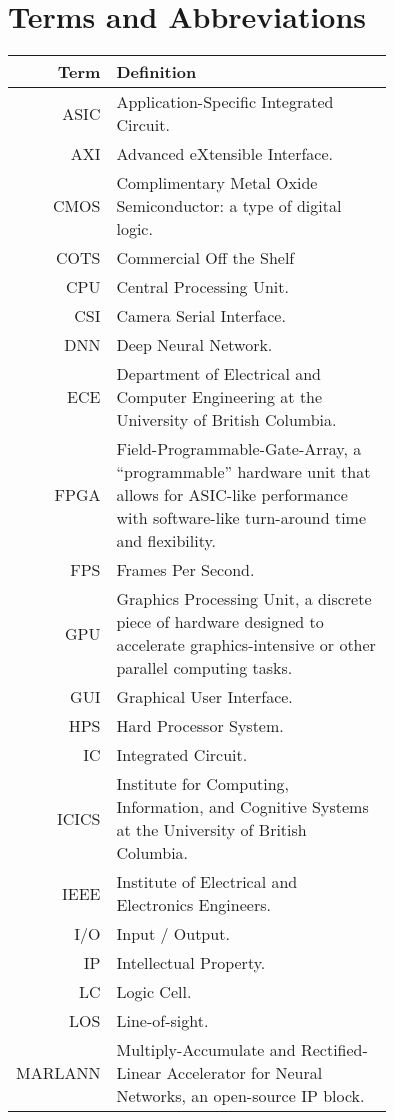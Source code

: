 \section*{Terms and Abbreviations}

\begin{tabular}[h]{rp{0.75\linewidth}}
    \hline
    \textbf{Term} & \textbf{Definition}\\
    \hline

    ASIC & Application-Specific Integrated Circuit.\\
    AXI & Advanced eXtensible Interface. \\
    CMOS & Complimentary Metal Oxide Semiconductor: a type of digital logic. \\
    COTS & Commercial Off the Shelf \\
    CPU & Central Processing Unit. \\
    CSI & Camera Serial Interface. \\
    DNN & Deep Neural Network. \\
    ECE & Department of Electrical and Computer Engineering at the University of British Columbia.\\
    FPGA & Field-Programmable-Gate-Array, a ``programmable'' hardware unit that allows for ASIC-like performance with software-like turn-around time and flexibility.\\
    FPS & Frames Per Second.\\
    GPU & Graphics Processing Unit, a discrete piece of hardware designed to accelerate graphics-intensive or other parallel computing tasks.\\
    GUI & Graphical User Interface. \\
    HPS & Hard Processor System. \\
    IC & Integrated Circuit. \\
	ICICS & Institute for Computing, Information, and Cognitive Systems at the University of British Columbia.\\
    IEEE & Institute of Electrical and Electronics Engineers. \\
    I/O & Input / Output. \\
    IP & Intellectual Property. \\
    LC & Logic Cell. \\
    LOS & Line-of-sight.\\
    MARLANN & Multiply-Accumulate and Rectified-Linear Accelerator for Neural Networks, an open-source IP block. \\

\end{tabular}
